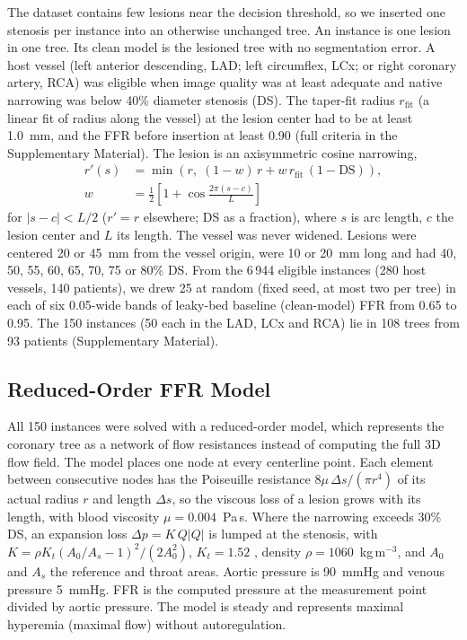 \documentclass[journal,twoside,web]{ieeecolor}
\begin{document}
The dataset contains few lesions near the decision threshold, so we inserted one stenosis per instance into an
otherwise unchanged tree. An instance is one lesion in one tree. Its clean model is the lesioned tree with no segmentation error. A host vessel (left anterior descending, LAD; left circumflex, LCx; or right coronary artery, RCA) was eligible when image quality was at least adequate and native narrowing was below 40\% diameter stenosis (DS). The taper-fit radius $r_\mathrm{fit}$ (a linear fit of radius along the vessel) at the lesion center had to be at least 1.0~mm, and the FFR before insertion at least 0.90 (full criteria in the Supplementary Material). The lesion is an axisymmetric cosine narrowing,
\begin{equation}
\begin{aligned}
r'(s) &= \min\!\left(r,\; (1-w)\,r + w\,r_\mathrm{fit}\,(1-\mathrm{DS})\right),\\
w &= \tfrac{1}{2}\left[1+\cos\tfrac{2\pi (s-c)}{L}\right]
\end{aligned}
\end{equation}
for $|s-c|<L/2$ ($r'=r$ elsewhere; DS as a fraction), where $s$ is arc length, $c$ the lesion center and $L$ its length. The vessel was never widened.
Lesions were centered 20 or 45~mm from the vessel origin, were 10 or 20~mm long and had 40, 50, 55, 60, 65, 70, 75
or 80\% DS. From the 6\,944 eligible instances (280 host vessels, 140 patients), we drew 25 at random (fixed seed, at most two per tree) in each of six 0.05-wide bands of leaky-bed baseline (clean-model) FFR from 0.65 to 0.95. The 150 instances (50 each in the LAD, LCx and RCA) lie in 108 trees from 93 patients (Supplementary Material).

\subsection{Reduced-Order FFR Model}
All 150 instances were solved with a reduced-order model, which represents the coronary tree as a network of flow
resistances instead of computing the full 3D flow field. The model places one node at every centerline point. Each element between consecutive nodes has the Poiseuille
resistance $8\mu\,\Delta s/(\pi r^4)$ of its actual radius $r$ and length $\Delta s$, so the viscous loss of a lesion grows with its length, with blood viscosity
$\mu = 0.004$~Pa\,s. Where the narrowing exceeds 30\% DS, an expansion loss $\Delta p = K\,Q|Q|$ is lumped at the
stenosis, with $K = \rho K_t (A_0/A_s - 1)^2 / (2A_0^2)$, $K_t = 1.52$ \cite{young1973}, density
$\rho = 1060$~kg\,m$^{-3}$, and $A_0$ and $A_s$ the reference and throat areas. Aortic pressure is 90~mmHg and
venous pressure 5~mmHg. FFR is the computed
pressure at the measurement point divided by aortic pressure. The model is steady and represents maximal hyperemia
(maximal flow) without autoregulation.
\end{document}
